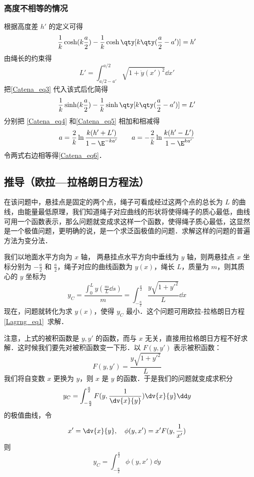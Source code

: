 \subsubsection{高度不相等的情况}
根据高度差 $h'$ 的定义可得
\begin{equation}\label{Catena_eq4}
\frac{1}{k}\cosh(k\frac{a}{2}) - \frac{1}{k}\cosh\qty[k\qty(\frac{a}{2}-a')] = h'
\end{equation}
由绳长的约束得
\begin{equation}
L' = \int_{a/2-a'}^{a/2} \sqrt{1 + \dot y(x')^2} \dd{x'}
\end{equation}
把\autoref{Catena_eq3} 代入该式后化简得
\begin{equation}\label{Catena_eq5}
\frac{1}{k}\sinh(k\frac{a}{2}) - \frac{1}{k}\sinh\qty[k\qty(\frac{a}{2}-a')] = L'
\end{equation}
分别把 \autoref{Catena_eq4} 和\autoref{Catena_eq5} 相加和相减得
\begin{equation}
a = \frac{2}{k} \ln\frac{k(h'+L')}{1 - \E^{-ka'}}
\qquad
a = -\frac{2}{k} \ln\frac{k(h'-L')}{1 - \E^{ka'}}
\end{equation}
令两式右边相等得\autoref{Catena_eq6}．

\subsection{推导（欧拉—拉格朗日方程法）}
在该问题中，悬挂点是固定的两个点，绳子可看成经过这两个点的总长为 $L$ 的曲线，由能量最低原理，我们知道绳子对应曲线的形状将使得绳子的质心最低，曲线可用一个函数表示，那么问题就变成求这样一个函数，使得绳子质心最低，这显然是一个极值问题，更明确的说，是一个求泛函极值的问题．求解这样的问题的普遍方法为变分法．

我们以地面水平方向为 $x$ 轴， 两悬挂点水平方向中垂线为 $y$ 轴，则两悬挂点 $x$ 坐标分别为 $-\frac{a}{2}$ 和 $\frac{a}{2}$，绳子对应的曲线函数为 $y(x)$，绳长 $L$，质量为 $m$，则其质心的 $y$ 坐标为
\begin{equation}
y_C=\frac{\int_{0}^{L}y(\frac{m}{L}\dd s)}{m}=\int_{-\frac{a}{2}}^{\frac{a}{2}} \frac{y\sqrt{1+y'^2}}{L}\dd x
\end{equation}
现在，问题就转化为求 $y(x)$，使得 $y_C$ 最小．这个问题可用欧拉-拉格朗日方程\autoref{Lagrng_eq1}~求解．

注意，上式的被积函数是 $y,y'$ 的函数，而与 $x$ 无关，直接用拉格朗日方程不好求解．这时候我们要先对被积函数变一下形．以 $F(y,y')$ 表示被积函数： 
\begin{equation}\label{Catena_eq05}
F(y,y')=\frac{y\sqrt{1+y'^2}}{L}
\end{equation}
我们将自变数 $x$ 更换为 $y$，则 $x$ 是 $y$ 的函数．于是我们的问题就变成求积分
\begin{equation}
y_C=\int_{-\frac{a}{2}}^{\frac{a}{2}} F(y,\frac{1}{\dv {x}{y} })\dv{x}{y}\dd y
\end{equation}
的极值曲线，令 
\begin{equation}\label{Catena_eq9}
x'=\dv{x}{y},\quad \phi(y,x')=x'F(y,\frac{1}{x'})
\end{equation}
则
\begin{equation}
y_C=\int_{-\frac{a}{2}}^{\frac{a}{2}} \phi(y,x')\dd y
\end{equation}

